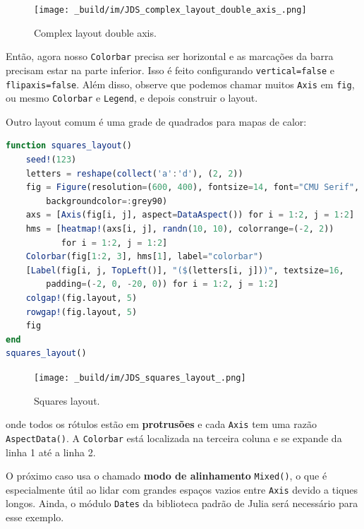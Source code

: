 \documentclass[
  notoc %
]{tufte-book}
\newcommand{\passthrough}[1]{#1}
\begin{document}
\begin{figure}
\hypertarget{fig:complex_layout_double_axis}{%
\centering
\texttt{[image: \_build/im/JDS\_complex\_layout\_double\_axis\_.png]}
\caption{Complex layout double
axis.}\label{fig:complex_layout_double_axis}
}
\end{figure}

Então, agora nosso \passthrough{\lstinline!Colorbar!} precisa ser
horizontal e as marcações da barra precisam estar na parte inferior.
Isso é feito configurando \passthrough{\lstinline!vertical=false!} e
\passthrough{\lstinline!flipaxis=false!}. Além disso, observe que
podemos chamar muitos \passthrough{\lstinline!Axis!} em
\passthrough{\lstinline!fig!}, ou mesmo
\passthrough{\lstinline!Colorbar!} e \passthrough{\lstinline!Legend!}, e
depois construir o layout.

Outro layout comum é uma grade de quadrados para mapas de calor:

\begin{lstlisting}[language=Julia]
function squares_layout()
    seed!(123)
    letters = reshape(collect('a':'d'), (2, 2))
    fig = Figure(resolution=(600, 400), fontsize=14, font="CMU Serif",
        backgroundcolor=:grey90)
    axs = [Axis(fig[i, j], aspect=DataAspect()) for i = 1:2, j = 1:2]
    hms = [heatmap!(axs[i, j], randn(10, 10), colorrange=(-2, 2))
           for i = 1:2, j = 1:2]
    Colorbar(fig[1:2, 3], hms[1], label="colorbar")
    [Label(fig[i, j, TopLeft()], "($(letters[i, j]))", textsize=16,
        padding=(-2, 0, -20, 0)) for i = 1:2, j = 1:2]
    colgap!(fig.layout, 5)
    rowgap!(fig.layout, 5)
    fig
end
squares_layout()
\end{lstlisting}

\begin{figure}
\hypertarget{fig:squares_layout}{%
\centering
\texttt{[image: \_build/im/JDS\_squares\_layout\_.png]}
\caption{Squares layout.}\label{fig:squares_layout}
}
\end{figure}

onde todos os rótulos estão em \textbf{protrusões} e cada
\passthrough{\lstinline!Axis!} tem uma razão
\passthrough{\lstinline!AspectData()!}. A
\passthrough{\lstinline!Colorbar!} está localizada na terceira coluna e
se expande da linha 1 até a linha 2.

O próximo caso usa o chamado \textbf{modo de alinhamento}
\passthrough{\lstinline!Mixed()!}, o que é especialmente útil ao lidar
com grandes espaços vazios entre \passthrough{\lstinline!Axis!} devido a
tiques longos. Ainda, o módulo \passthrough{\lstinline!Dates!} da
biblioteca padrão de Julia será necessário para esse exemplo.
\end{document}
